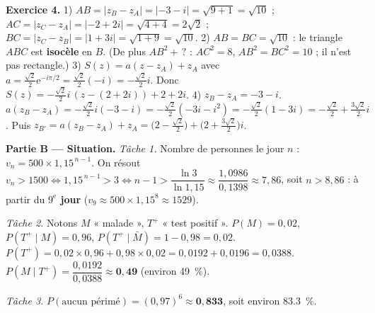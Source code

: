 \noindent\textbf{Exercice 4.}
1) $AB=|z_B-z_A|=|-3-i|=\sqrt{9+1}=\sqrt{10}$ ;
$AC=|z_C-z_A|=|-2+2i|=\sqrt{4+4}=2\sqrt2$ ;
$BC=|z_C-z_B|=|1+3i|=\sqrt{1+9}=\sqrt{10}$.
2) $AB=BC=\sqrt{10}$ : le triangle $ABC$ est \textbf{isocèle} en $B$.
(De plus $AB^2+\,?$ : $AC^2=8$, $AB^2=BC^2=10$ ; il n'est pas rectangle.)
3) $S(z)=a(z-z_A)+z_A$ avec $a=\frac{\sqrt2}{2}\mathrm{e}^{-i\pi/2}=\frac{\sqrt2}{2}(-i)=-\frac{\sqrt2}{2}i$.
Donc $S(z)=-\frac{\sqrt2}{2}i\,(z-(2+2i))+2+2i$.
4) $z_B-z_A=-3-i$. $a(z_B-z_A)=-\frac{\sqrt2}{2}i(-3-i)=-\frac{\sqrt2}{2}(-3i-i^2)
=-\frac{\sqrt2}{2}(1-3i)=-\frac{\sqrt2}{2}+\frac{3\sqrt2}{2}i$.
Puis $z_{B'}=a(z_B-z_A)+z_A=\big(2-\tfrac{\sqrt2}{2}\big)+\big(2+\tfrac{3\sqrt2}{2}\big)i$.

\smallskip
\noindent\textbf{Partie B — Situation.}
\emph{Tâche 1.} Nombre de personnes le jour $n$ : $v_n=500\times1{,}15^{\,n-1}$. On résout
$v_n>1500\iff1{,}15^{\,n-1}>3\iff n-1>\dfrac{\ln3}{\ln1{,}15}\approx\dfrac{1{,}0986}{0{,}1398}\approx7{,}86$,
soit $n>8{,}86$ : à partir du \textbf{$9^{\mathrm e}$ jour} ($v_9\approx500\times1{,}15^8\approx1529$).

\emph{Tâche 2.} Notons $M$ « malade », $T^+$ « test positif ». $P(M)=0{,}02$,
$P(T^+\mid M)=0{,}96$, $P(T^+\mid\bar M)=1-0{,}98=0{,}02$.
$P(T^+)=0{,}02\times0{,}96+0{,}98\times0{,}02=0{,}0192+0{,}0196=0{,}0388$.
$P(M\mid T^+)=\dfrac{0{,}0192}{0{,}0388}\approx\mathbf{0{,}49}$ (environ \SI{49}{\percent}).

\emph{Tâche 3.} $P(\text{aucun périmé})=(0{,}97)^6\approx\mathbf{0{,}833}$, soit environ \SI{83,3}{\percent}.
